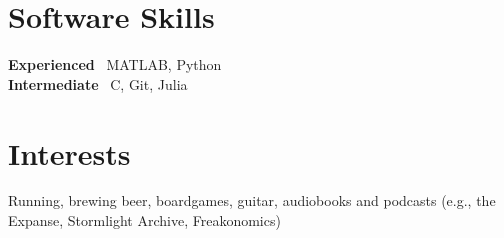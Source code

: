 \documentclass[12pt,margintitle,line]{res}
\newcommand{\CC}{C\nolinebreak\hspace{-.05em}\raisebox{.4ex}{\scriptsize\bf +}\nolinebreak\hspace{-.10em}\raisebox{.4ex}{\scriptsize\bf +} }
\def\CC{{C\nolinebreak[4]\hspace{-.05em}\raisebox{.4ex}{\scriptsize\bf ++}}}
\begin{document}
\begin{resume}

\section{Software Skills}

\title{}
\employer{}
\dates{}
\begin{position}

\vspace{-2.4cm}
\textbf{Experienced}  \ MATLAB, Python
	\\
\textbf{Intermediate} \ \CC, Git, Julia
\end{position}


\section{Interests}

\vspace{-1.0cm}
\title{}
\employer{}
\dates{}
\begin{position}
Running, brewing beer, boardgames, guitar, audiobooks and podcasts (e.g., the Expanse, Stormlight Archive, Freakonomics)
\end{position}


\end{resume}
\end{document}
